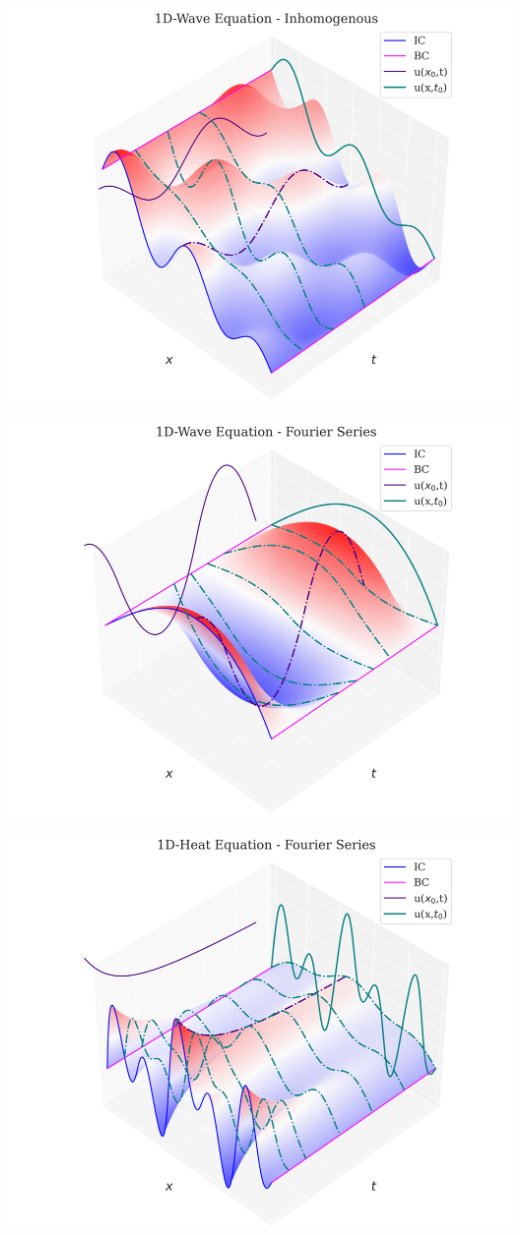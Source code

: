 \includegraphics[width=0.85\linewidth]{../images/1d_wave_inhom.png}

\includegraphics[width=0.85\linewidth]{../images/1d_wave_fs.png}

\includegraphics[width=0.85\linewidth]{../images/1d_heat_fs.png}

